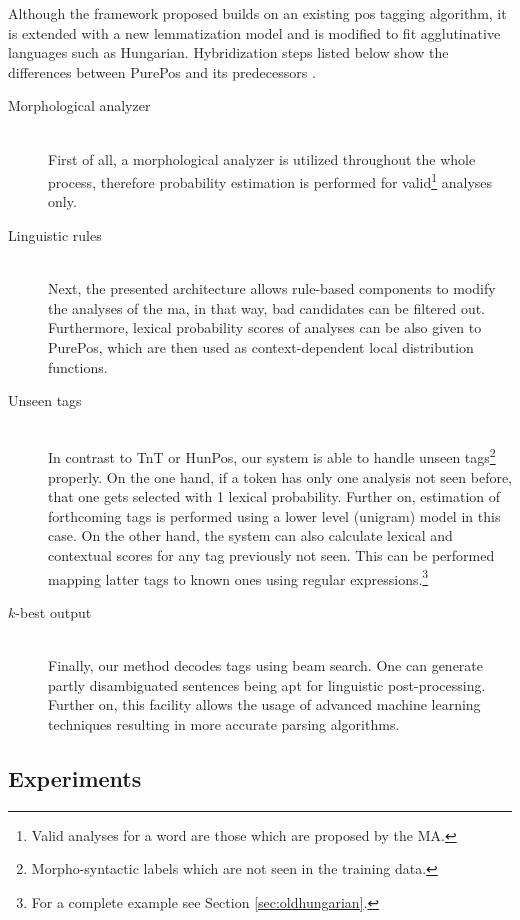 Although the framework proposed builds on an existing \gls{pos} tagging algorithm, it is extended with a new lemmatization model and is modified to fit agglutinative languages such as Hungarian. 
Hybridization steps listed below show the differences between PurePos and its predecessors \cite{Brants2000,Halacsy2007}.

\begin{description}
  \item[Morphological analyzer] \hfill \\
  First of all, a morphological analyzer is utilized throughout the whole process, therefore probability estimation is performed for valid\footnote{Valid analyses for a word are those which are proposed by the MA.} analyses only.
  \item[Linguistic rules] \hfill \\
  Next, the presented architecture allows rule-based components to modify the analyses of the \acrshort{ma}, in that way, bad candidates can be filtered out. Furthermore, lexical probability scores of analyses can be also given to PurePos, which are then used as context-dependent local distribution functions. 
  \item[Unseen tags] \hfill \\ 
  In contrast to TnT or HunPos, our system is able to handle unseen tags\footnote{Morpho-syntactic labels which are not seen in the training data.} properly. On the one hand, if a token has only one analysis not seen before, that one gets selected with 1 lexical probability. Further on, estimation of forthcoming tags is performed using a lower level (unigram) model in this case. On the other hand, the system can also calculate lexical and contextual scores for any tag previously not seen. This can be performed mapping latter tags to known ones using regular expressions.\footnote{For a complete example see Section \ref{sec:oldhungarian}.}
  \item[$k$-best output] \hfill \\
  Finally, our method decodes tags using beam search. One can generate partly disambiguated sentences being apt for linguistic post-processing. Further on, this facility allows the usage of advanced machine learning techniques resulting in more accurate parsing algorithms.
\end{description}


\subsection{Experiments}

